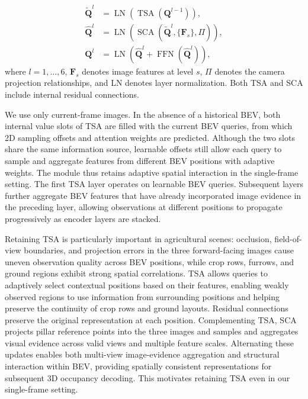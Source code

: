 \documentclass[a4paper,fleqn]{cas-sc}
\begin{document}
\begin{equation}
\begin{aligned}
\widetilde{\bm Q}^{l}&=\operatorname{LN}\!\left(\operatorname{TSA}(\bm Q^{l-1})\right),\\
\widehat{\bm Q}^{l}&=\operatorname{LN}\!\left(\operatorname{SCA}(\widetilde{\bm Q}^{l},\{\bm F_s\},\Pi)\right),\\
\bm Q^l&=\operatorname{LN}\!\left(\widehat{\bm Q}^{l}+\operatorname{FFN}(\widehat{\bm Q}^{l})\right),
\end{aligned}
\end{equation}
where $l=1,\ldots,6$, $\bm F_s$ denotes image features at level $s$, $\Pi$ denotes the camera projection relationships, and LN denotes layer normalization. Both TSA and SCA include internal residual connections.

We use only current-frame images. In the absence of a historical BEV, both internal value slots of TSA are filled with the current BEV queries, from which 2D sampling offsets and attention weights are predicted.
Although the two slots share the same information source, learnable offsets still allow each query to sample and aggregate features from different BEV positions with adaptive weights. The module thus retains adaptive spatial interaction in the single-frame setting.
The first TSA layer operates on learnable BEV queries. Subsequent layers further aggregate BEV features that have already incorporated image evidence in the preceding layer, allowing observations at different positions to propagate progressively as encoder layers are stacked.

Retaining TSA is particularly important in agricultural scenes: occlusion, field-of-view boundaries, and projection errors in the three forward-facing images cause uneven observation quality across BEV positions, while crop rows, furrows, and ground regions exhibit strong spatial correlations.
TSA allows queries to adaptively select contextual positions based on their features, enabling weakly observed regions to use information from surrounding positions and helping preserve the continuity of crop rows and ground layouts. Residual connections preserve the original representation at each position.
Complementing TSA, SCA projects pillar reference points into the three images and samples and aggregates visual evidence across valid views and multiple feature scales.
Alternating these updates enables both multi-view image-evidence aggregation and structural interaction within BEV, providing spatially consistent representations for subsequent 3D occupancy decoding. This motivates retaining TSA even in our single-frame setting.
\end{document}
